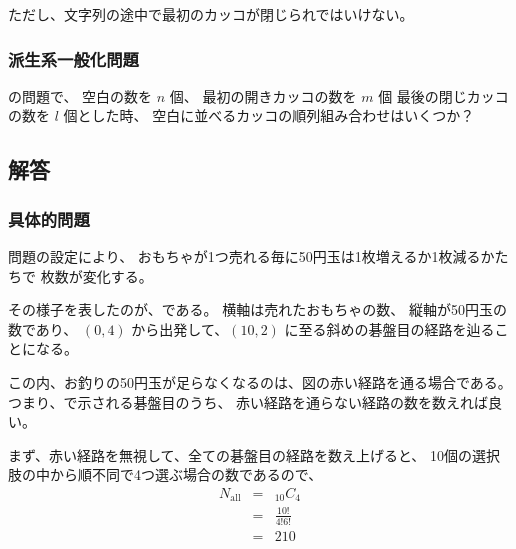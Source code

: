 ただし、文字列の途中で最初のカッコが閉じられではいけない。

\subsubsection{派生系一般化問題}
\label{sssec:お釣り:問題:派生系一般化問題}

の問題で、
空白の数を $n$ 個、
最初の開きカッコの数を $m$ 個
最後の閉じカッコの数を $l$ 個とした時、
空白に並べるカッコの順列組み合わせはいくつか？


\clearpage
\subsection{解答}
\label{ssec:お釣り:解答}

\subsubsection{具体的問題}
\label{sssec:お釣り:解答:具体的問題}

問題の設定により、
おもちゃが1つ売れる毎に50円玉は1枚増えるか1枚減るかたちで
枚数が変化する。

その様子を表したのが、である。
横軸は売れたおもちゃの数、
縦軸が50円玉の数であり、
$(0,4)$ から出発して、$(10,2)$ に至る斜めの碁盤目の経路を辿ることになる。

この内、お釣りの50円玉が足らなくなるのは、図の赤い経路を通る場合である。
つまり、で示される碁盤目のうち、
赤い経路を通らない経路の数を数えれば良い。

まず、赤い経路を無視して、全ての碁盤目の経路を数え上げると、
10個の選択肢の中から順不同で4つ選ぶ場合の数であるので、
  \begin{eqnarray}
    N_{\text{all}} & = & _{10}C_{4}
  \\
      & = &
        \frac{10!}{4! 6!}
  \\
      & = &
        210
  \end{eqnarray}
  
